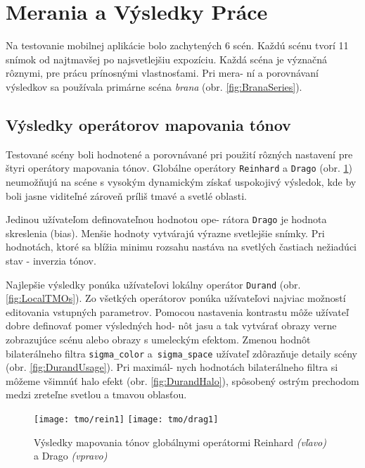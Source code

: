 \documentclass[slovak]{ExcelAtFIT}
\begin{document}
\section{Merania a Výsledky Práce}
\label{sec:Result}

Na testovanie mobilnej aplikácie bolo zachytených 6 scén. Každú scénu tvorí 11 snímok od najtmavšej po najsvetlejšiu
expozíciu. Každá scéna je význačná rôznymi, pre prácu prínosnými vlastnosťami. Pri mera- ní a porovnávaní výsledkov
sa používala primárne scéna \textit{brana} (obr. \ref{fig:BranaSeries}).

\subsection{Výsledky operátorov mapovania tónov}
\label{sec:Result-TMO}

Testované scény boli hodnotené a porovnávané pri použití rôzných nastavení pre štyri operátory mapovania tónov.
Globálne operátory \texttt{Reinhard} a \texttt{Drago} (obr. \ref{fig:GlobalTMOs}) neumožňujú na scéne s vysokým
dynamickým získať uspokojivý výsledok, kde by boli jasne viditeľné zároveň príliš tmavé a svetlé oblasti.

Jedinou užívateľom definovateľnou hodnotou ope- rátora \texttt{Drago} je hodnota skreslenia (bias). Menšie hodnoty vytvárajú
výrazne svetlejšie snímky. Pri hodnotách, ktoré sa blížia minimu rozsahu nastáva na svetlých častiach nežiadúci stav - inverzia
tónov.

Najlepšie výsledky ponúka užívateľovi lokálny operátor \texttt{Durand} (obr. \ref{fig:LocalTMOs}). Zo všetkých operátorov ponúka
užívateľovi najviac možností editovania vstupných parametrov. Pomocou nastavenia kontrastu môže užívateľ dobre definovať pomer
výsledných hod- nôt jasu a tak vytvárať obrazy verne zobrazujúce scénu alebo obrazy s umeleckým efektom. Zmenou hodnôt
bilaterálneho filtra \texttt{sigma\_color} a~\texttt{sigma\_space} užívateľ zdôrazňuje detaily scény (obr. \ref{fig:DurandUsage}).
Pri maximál- nych hodnotách bilaterálneho filtra si môžeme všimnúť halo efekt (obr. \ref{fig:DurandHalo}), spôsobený ostrým
prechodom medzi zreteľne svetlou a tmavou oblasťou.

\begin{figure}[t]
  \centering
	\texttt{[image: tmo/rein1]}
	\texttt{[image: tmo/drag1]}
  \caption{Výsledky mapovania tónov globálnymi operátormi Reinhard \textit{(vľavo)} a Drago \textit{(vpravo)}}
  \label{fig:GlobalTMOs}
\end{figure}
\end{document}
